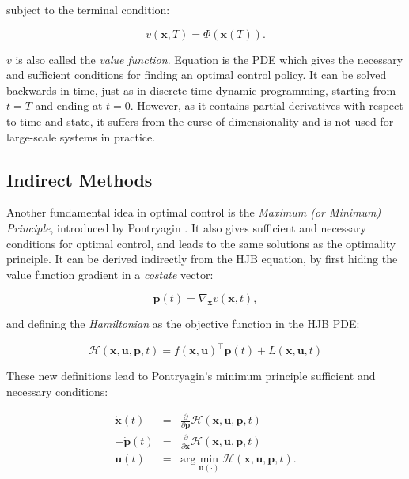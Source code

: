 subject to the terminal condition:

\begin{equation}
\label{eq:chap3-hjb-cond}
v(\mathbf{x},T)=\Phi(\mathbf{x}(T)).
\end{equation}

$v$ is also called the \emph{value function}. Equation
 is the PDE which gives the necessary and sufficient
conditions for finding an optimal control policy. It can be solved
backwards in time, just as in discrete-time dynamic programming,
starting from $t=T$ and ending at $ t=0$. However, as it contains
partial derivatives with respect to time and state, it suffers from
the curse of dimensionality and is not used for large-scale systems in
practice.

\subsection{Indirect Methods}

Another fundamental idea in optimal control is the \emph{Maximum (or
  Minimum) Principle}, introduced by Pontryagin
\cite{boltyanskii1960theory}. It also gives sufficient and necessary
conditions for optimal control, and leads to the same solutions as the
optimality principle. It can be derived indirectly from the HJB
equation, by first hiding the value function gradient in a
\emph{costate} vector:

\begin{equation}
  \mathbf{p}(t) = \nabla_{\mathbf{x}} v(\mathbf{x},t),
\end{equation} 

and defining the \emph{Hamiltonian} as the objective function in the
HJB PDE:

\begin{equation}
  \mathcal{H}(\mathbf{x},\mathbf{u},\mathbf{p},t) = f(\mathbf{x},
  \mathbf{u})^{\top}\mathbf{p}(t) + L (\mathbf{x}, \mathbf{u},t)
\end{equation}

These new definitions lead to Pontryagin's minimum principle
sufficient and necessary conditions:

\begin{equation}
\begin{array}{rcl}
\dot{\mathbf{x}}(t) &=&
\frac{\partial}{\partial\mathbf{p}}\mathcal{H}(\mathbf{x},\mathbf{u},\mathbf{p},t)
\\ -\dot{\mathbf{p}}(t) &=&
\frac{\partial}{\partial\mathbf{x}}\mathcal{H}(\mathbf{x},\mathbf{u},\mathbf{p},t)
\\ \mathbf{u}(t) &=&
\text{arg}\min_{\mathbf{u}(\cdot)}\mathcal{H}(\mathbf{x},\mathbf{u},\mathbf{p},t).
\end{array}
\end{equation}

